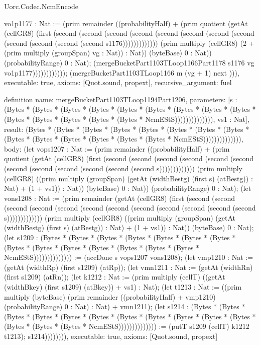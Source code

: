 \begin{lexlean}{Uorc.Codec.NcmEncode}
\begin{semanticmodule}
{vo1p1177 : Nat := (prim remainder ((probabilityHalf) + (prim quotient (getAt (cellGR8) (first (second (second (second (second (second (second (second (second (second (second (second (second s1176))))))))))))) (prim multiply (cellGR8) (2 + (prim multiply (groupSpan) vg : Nat)) : Nat)) (byteBase) 0 : Nat)) (probabilityRange) 0 : Nat); (mergeBucketPart1103TLoop1166Part1178 s1176 vg vo1p1177)))))))))))); (mergeBucketPart1103TLoop1166 m (vg + 1) next ))),
  executable: true,
  axioms: [Quot.sound, propext],
  recursive_argument: fuel
}

definition{
  name: mergeBucketPart1103TLoop1194Part1206,
  parameters: [s : (Bytes * (Bytes * (Bytes * (Bytes * (Bytes * (Bytes * (Bytes * (Bytes * (Bytes * (Bytes * (Bytes * (Bytes * (Bytes * (Bytes * NcmEStS)))))))))))))), vs1 : Nat],
  result: (Bytes * (Bytes * (Bytes * (Bytes * (Bytes * (Bytes * (Bytes * (Bytes * (Bytes * (Bytes * (Bytes * (Bytes * (Bytes * (Bytes * NcmEStS)))))))))))))),
  body: (let vops1207 : Nat := (prim remainder ((probabilityHalf) + (prim quotient (getAt (cellGR8) (first (second (second (second (second (second (second (second (second (second (second (second (second s))))))))))))) (prim multiply (cellGR8) ((prim multiply (groupSpan) (getAt (widthBestg) (first s) (atBestg)) : Nat) + (1 + vs1)) : Nat)) (byteBase) 0 : Nat)) (probabilityRange) 0 : Nat); (let vons1208 : Nat := (prim remainder (getAt (cellGR8) (first (second (second (second (second (second (second (second (second (second (second (second (second s))))))))))))) (prim multiply (cellGR8) ((prim multiply (groupSpan) (getAt (widthBestg) (first s) (atBestg)) : Nat) + (1 + vs1)) : Nat)) (byteBase) 0 : Nat); (let s1209 : (Bytes * (Bytes * (Bytes * (Bytes * (Bytes * (Bytes * (Bytes * (Bytes * (Bytes * (Bytes * (Bytes * (Bytes * (Bytes * (Bytes * NcmEStS)))))))))))))) := (accDone s vops1207 vons1208); (let vmp1210 : Nat := (getAt (widthRp) (first s1209) (atRp)); (let vmn1211 : Nat := (getAt (widthRn) (first s1209) (atRn)); (let k1212 : Nat := (prim multiply (cellT) ((getAt (widthBkey) (first s1209) (atBkey)) + vs1) : Nat); (let t1213 : Nat := ((prim multiply (byteBase) (prim remainder ((probabilityHalf) + vmp1210) (probabilityRange) 0 : Nat) : Nat) + vmn1211); (let s1214 : (Bytes * (Bytes * (Bytes * (Bytes * (Bytes * (Bytes * (Bytes * (Bytes * (Bytes * (Bytes * (Bytes * (Bytes * (Bytes * (Bytes * NcmEStS)))))))))))))) := (putT s1209 (cellT) k1212 t1213); s1214)))))))),
  executable: true,
  axioms: [Quot.sound, propext]
}


\end{semanticmodule}
\end{lexlean}
